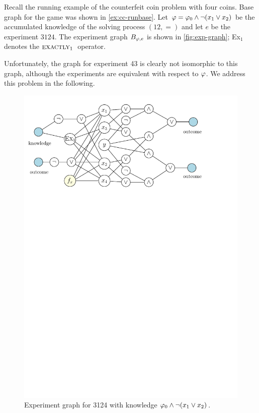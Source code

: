 \begin{example}
Recall the running example of the counterfeit coin problem with four coins.
Base graph for the game was shown in \autoref{ex:cc-runbase}.
Let $\varphi=\varphi_0\wedge\neg(x_1\vee x_2)$ be the accumulated knowledge
  of the solving process $(12, =)$ and let $e$ be the experiment $3124$.
The experiment graph $B_{\varphi, e}$ is shown in \autoref{fig:exp-graph};
  Ex$_1$ denotes the $\textsc{exactly}_{1}\:$ operator.

Unfortunately, the graph for experiment 43 is clearly not isomorphic to this graph,
although the experiments are equivalent with respect to $\varphi$.
We address this problem in the following.\eqed

\begin{figure}[tt]
\begin{center}
\includegraphics[width=.7\textwidth]{pictures/exp-graph.pdf}
\caption{Experiment graph for 3124 with knowledge $\varphi_0\wedge\neg(x_1\vee x_2)$.}
\label{fig:exp-graph}
\end{center}
\end{figure}
\begin{figure}[t]
\begin{center}

\end{center}
\end{figure}
\end{example}
